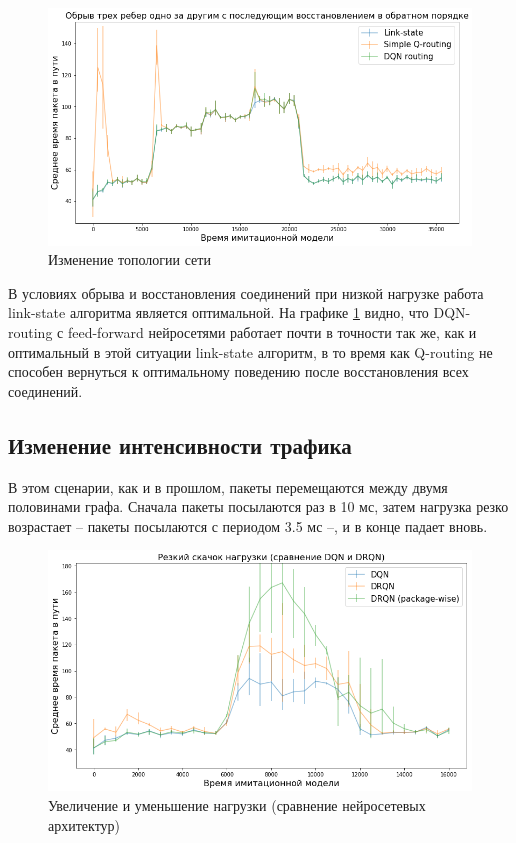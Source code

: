 \documentclass[specification, annotation]{itmo-student-thesis}
\begin{document}
\begin{figure}[!h]
  \caption{Изменение топологии сети}\label{experiment-link-failures}
  \centering
  \includegraphics[scale=0.6]{experiment-link-failures}
\end{figure}

В условиях обрыва и восстановления соединений при низкой нагрузке работа
link-state алгоритма является оптимальной. На графике
\ref{experiment-link-failures} видно, что DQN-routing с feed-forward нейросетями
работает почти в точности так же, как и оптимальный в этой ситуации link-state
алгоритм, в то время как Q-routing не способен вернуться к оптимальному
поведению после восстановления всех соединений.

\subsection{Изменение интенсивности трафика}\label{experiments:simple/load}

В этом сценарии, как и в прошлом, пакеты перемещаются между двумя половинами
графа. Сначала пакеты посылаются раз в 10 мс, затем нагрузка резко возрастает --
пакеты посылаются с периодом 3.5 мс --, и в конце падает вновь.

\begin{figure}[!h]
  \caption{Увеличение и уменьшение нагрузки (сравнение нейросетевых
    архитектур)}\label{experiment-rnn-comparison}
  \centering
  \includegraphics[scale=0.6]{experiment-rnn-comparison}
\end{figure}
\end{document}
